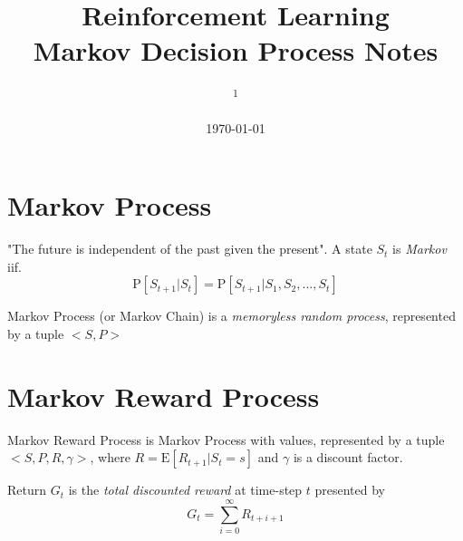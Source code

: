 \documentclass[10pt, a4paper, twocolumn]{article} %
\title{Reinforcement Learning \\ Markov Decision Process Notes} %
\author{
	\authorstyle{Lu Hong \textsuperscript{1}}
	\newline\newline %
	\textsuperscript{1}\institution{Nanjing University of Aeronautics and Astronautics}\\ %
}
\date{\today} %
\begin{document}
\maketitle %

\thispagestyle{firstpage} %





\section{Markov Process}
"The future is independent of the past given the present". A state $S_{t}$ is \textsl{Markov} iif.  $$ \textrm{P} [S_{t+1} | S_{t} ] = \textrm{P} [ S_{t+1} | S_{1}, S_{2}, ..., S_{t} ] $$

Markov Process (or Markov Chain) is a \textit{memoryless random process}, represented by a tuple $<S,P>$


\section{Markov Reward Process}
Markov Reward Process is Markov Process with values, represented by a tuple $<S,P,R,\gamma>$, where $R = \textrm{E}[R_{t+1} | S_{t} = s]$  and $\gamma$ is a discount factor.

Return $G_{t}$ is the \textsl{total discounted reward} at time-step $t$ presented by $$G_{t} = \sum_{i = 0}^{\infty} R_{t+i+1}$$
\end{document}
